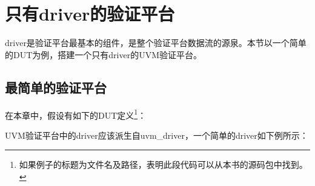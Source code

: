 \section{只有driver的验证平台}\label{sec2-2}
driver是验证平台最基本的组件，是整个验证平台数据流的源泉。本节以一个简单的DUT为例，搭建一个只有driver的UVM验证平台。

\subsection{最简单的验证平台}\label{subsec2-2-1}
在本章中，假设有如下的DUT定义\footnote{如果例子的标题为文件名及路径，表明此段代码可以从本书的源码包中找到。}：



UVM验证平台中的driver应该派生自uvm\_driver，一个简单的driver如下例所示：


